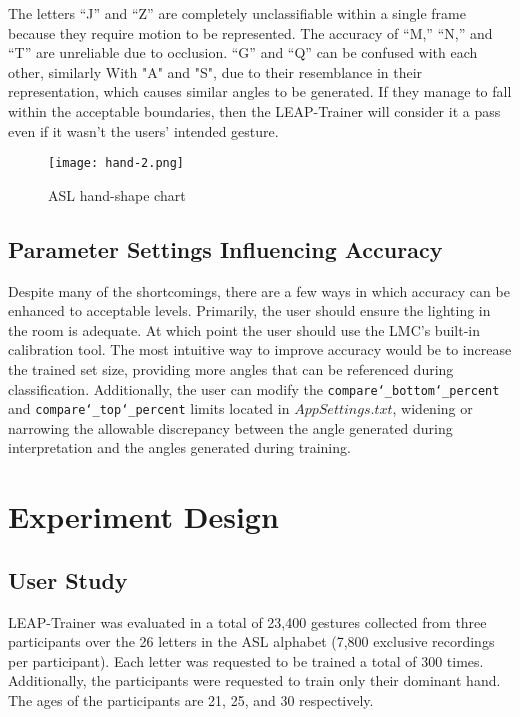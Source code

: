 \documentclass[letterpaper, 10 pt, conference]{ieeeconf}
\begin{document}
\vspace{5pt}
The letters “J” and “Z” are completely unclassifiable within a single frame because they require motion to be represented. The accuracy of “M,” “N,” and “T” are unreliable due to occlusion. “G” and “Q” can be confused with each other, similarly With "A" and "S", due to their resemblance in their representation, which causes similar angles to be generated. If they manage to fall within the acceptable boundaries, then the LEAP-Trainer will consider it a pass even if it wasn't the users' intended gesture.

\begin{figure}[h]
    \centering
	\texttt{[image: hand-2.png]}
    \caption{ASL hand-shape chart \cite{ASLCHART}}
\end{figure}

\subsection{Parameter Settings Influencing Accuracy}

Despite many of the shortcomings, there are a few ways in which accuracy can be enhanced to acceptable levels. Primarily, the user should ensure the lighting in the room is adequate. At which point the user should use the LMC’s built-in calibration tool. The most intuitive way to improve accuracy would be to increase the trained set size, providing more angles that can be referenced during classification. Additionally, the user can modify the \texttt{compare\char`_bottom\char`_percent} and \texttt{compare\char`_top\char`_percent}  limits located in $AppSettings.txt$, widening or narrowing the allowable discrepancy between the angle generated during interpretation and the angles generated during training. 


\section{Experiment Design}

\subsection{User Study}

LEAP-Trainer was evaluated in a total of 23,400 gestures collected from three participants over the 26 letters in the ASL alphabet (7,800 exclusive recordings per participant). Each letter was requested to be trained a total of 300 times. Additionally, the participants were requested to train only their dominant hand. The ages of the participants are 21, 25, and 30 respectively.
\end{document}
